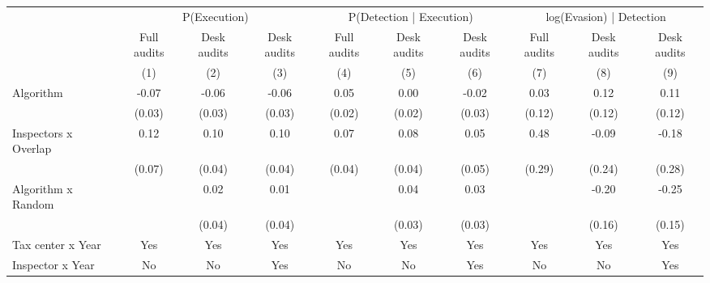 \begin{tabular}{lccc|ccc|ccc} \toprule
\multicolumn{1}{l}{} & \multicolumn{3}{c}{P(Execution)} & \multicolumn{3}{c}{P(Detection | Execution)} & \multicolumn{3}{c}{log(Evasion) | Detection} \\\cmidrule(lr){2-4}\cmidrule(lr){5-7}\cmidrule(lr){8-10} \multicolumn{1}{l}{} & Full audits & Desk audits & Desk audits & Full audits & Desk audits & Desk audits & Full audits & Desk audits & Desk audits \\ \multicolumn{1}{l}{} & (1) & (2) & (3) & (4) & (5) & (6) & (7) & (8) & (9) \\ \midrule
Algorithm   &       -0.07\sym{**} &       -0.06\sym{**} &       -0.06\sym{**} &        0.05\sym{**} &        0.00         &       -0.02         &        0.03         &        0.12         &        0.11         \\
            &      (0.03)         &      (0.03)         &      (0.03)         &      (0.02)         &      (0.02)         &      (0.03)         &      (0.12)         &      (0.12)         &      (0.12)         \\
\addlinespace
Inspectors x Overlap&        0.12\sym{*}  &        0.10\sym{**} &        0.10\sym{**} &        0.07\sym{*}  &        0.08\sym{**} &        0.05         &        0.48\sym{*}  &       -0.09         &       -0.18         \\
            &      (0.07)         &      (0.04)         &      (0.04)         &      (0.04)         &      (0.04)         &      (0.05)         &      (0.29)         &      (0.24)         &      (0.28)         \\
\addlinespace
Algorithm x Random&                     &        0.02         &        0.01         &                     &        0.04         &        0.03         &                     &       -0.20         &       -0.25\sym{*}  \\
            &                     &      (0.04)         &      (0.04)         &                     &      (0.03)         &      (0.03)         &                     &      (0.16)         &      (0.15)         \\
\midrule
Tax center x Year&         Yes         &         Yes         &         Yes         &         Yes         &         Yes         &         Yes         &         Yes         &         Yes         &         Yes         \\
Inspector x Year&          No         &          No         &         Yes         &          No         &          No         &         Yes         &          No         &          No         &         Yes         \\

\end{tabular}
